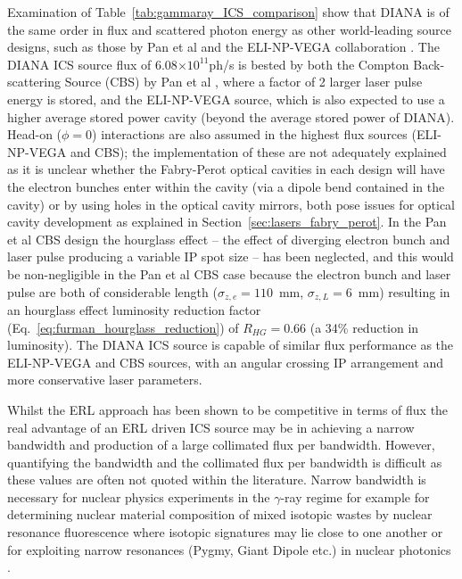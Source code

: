 \documentclass[../main.tex]{subfiles}
\begin{document}
Examination of Table~\ref{tab:gammaray_ICS_comparison} show that DIANA is of the same order in flux and scattered photon energy as other world-leading source designs, such as those by Pan et al \cite{pan2019design} and the ELI-NP-VEGA collaboration \cite{elinp2019vega,tanaka2020current}. The DIANA ICS source flux of 6.08$\times 10^{11}$ph/\si{\second} is bested by both the Compton Back-scattering Source (CBS) by Pan et al \cite{pan2019design}, where a factor of 2 larger laser pulse energy is stored, and the ELI-NP-VEGA source, which is also expected to use a higher average stored power cavity (beyond the average stored power of DIANA). Head-on ($\phi=0$) interactions are also assumed in the highest flux sources (ELI-NP-VEGA and CBS); the implementation of these are not adequately explained as it is unclear whether the Fabry-Perot optical cavities in each design will have the electron bunches enter within the cavity (via a dipole bend contained in the cavity) or by using holes in the optical cavity mirrors, both pose issues for optical cavity development as explained in Section~\ref{sec:lasers_fabry_perot}. In the Pan et al CBS design\cite{pan2019design} the hourglass effect -- the effect of diverging electron bunch and laser pulse producing a variable IP spot size -- has been neglected, and this would be non-negligible in the Pan et al \cite{pan2019design} CBS case because the electron bunch and laser pulse are both of considerable length ($\sigma_{z,e} = 110$~\si{\milli\meter}, $\sigma_{z,L} = 6$~\si{\milli\meter}) resulting in an hourglass effect luminosity reduction factor (Eq.~\ref{eq:furman_hourglass_reduction}) of $R_{HG} = 0.66$ (a 34\% reduction in luminosity). The DIANA ICS source is capable of similar flux performance as the ELI-NP-VEGA and CBS sources, with an angular crossing IP arrangement and more conservative laser parameters. 

Whilst the ERL approach has been shown to be competitive in terms of flux the real advantage of an ERL driven ICS source may be in achieving a narrow bandwidth and production of a large collimated flux per bandwidth. However, quantifying the bandwidth and the collimated flux per bandwidth is difficult as these values are often not quoted within the literature. Narrow bandwidth is necessary for nuclear physics experiments in the $\gamma$-ray regime for example for determining nuclear material composition of mixed isotopic wastes by nuclear resonance fluorescence \cite{angell2015demonstration} where isotopic signatures may lie close to one another or for exploiting narrow resonances (Pygmy, Giant Dipole etc.) in nuclear photonics \cite{budker2021expanding}. 
\end{document}
